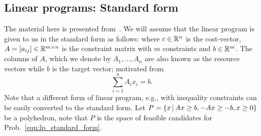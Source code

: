 \documentclass[letterpaper, 10pt, twocolumn, reqno]{amsart}
\begin{document}
\subsection{Linear programs: Standard form}
\label{ssec:lp_standard}

The material here is presented from~\cite{bertsimas1997introduction}. We will assume that the linear program is given to us in the standard form as follows:
where $c \in \mathbb{R}^n$ is the cost-vector, $A = [a_{ij}] \in \mathbb{R}^{m \times n}$ is the constraint matrix with $m$ constraints and $b \in \mathbb{R}^m$. The columns of $A$, which we denote by $A_1, \ldots, A_n$ are also known as the resource vectors while $b$ is the target vector; motivated from
$$\sum_{i=1}^n A_i x_i =b.$$
Note that a different form of linear program, e.g., with inequality constraints can be easily converted to the standard form.
Let $P = \left\{x \, \vert \, Ax \geq b, -Ax \geq -b, x \geq 0\right\}$ be a polyhedron, note that $P$ is the space of feasible candidates for Prob.~\eqref{eqn:lp_standard_form}.
\end{document}
